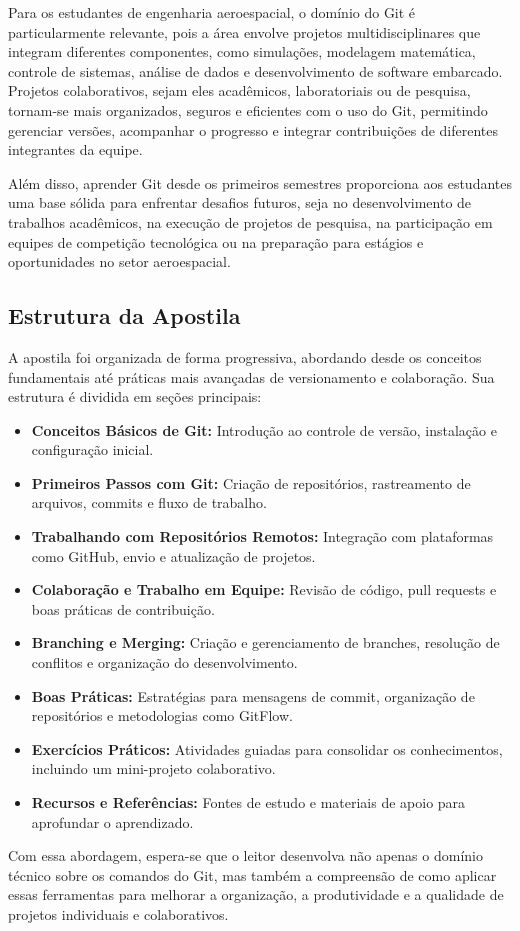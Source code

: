 Para os estudantes de engenharia aeroespacial, o domínio do Git é particularmente relevante, pois a área envolve projetos multidisciplinares que integram diferentes componentes, como simulações, modelagem matemática, controle de sistemas, análise de dados e desenvolvimento de software embarcado. Projetos colaborativos, sejam eles acadêmicos, laboratoriais ou de pesquisa, tornam-se mais organizados, seguros e eficientes com o uso do Git, permitindo gerenciar versões, acompanhar o progresso e integrar contribuições de diferentes integrantes da equipe.

Além disso, aprender Git desde os primeiros semestres proporciona aos estudantes uma base sólida para enfrentar desafios futuros, seja no desenvolvimento de trabalhos acadêmicos, na execução de projetos de pesquisa, na participação em equipes de competição tecnológica ou na preparação para estágios e oportunidades no setor aeroespacial.

\subsection{Estrutura da Apostila}

A apostila foi organizada de forma progressiva, abordando desde os conceitos fundamentais até práticas mais avançadas de versionamento e colaboração. Sua estrutura é dividida em seções principais:

\begin{itemize}
    \item \textbf{Conceitos Básicos de Git:} Introdução ao controle de versão, instalação e configuração inicial.
    \item \textbf{Primeiros Passos com Git:} Criação de repositórios, rastreamento de arquivos, commits e fluxo de trabalho.
    \item \textbf{Trabalhando com Repositórios Remotos:} Integração com plataformas como GitHub, envio e atualização de projetos.
    \item \textbf{Colaboração e Trabalho em Equipe:} Revisão de código, pull requests e boas práticas de contribuição.
    \item \textbf{Branching e Merging:} Criação e gerenciamento de branches, resolução de conflitos e organização do desenvolvimento.
    \item \textbf{Boas Práticas:} Estratégias para mensagens de commit, organização de repositórios e metodologias como GitFlow.
    \item \textbf{Exercícios Práticos:} Atividades guiadas para consolidar os conhecimentos, incluindo um mini-projeto colaborativo.
    \item \textbf{Recursos e Referências:} Fontes de estudo e materiais de apoio para aprofundar o aprendizado.
\end{itemize}

Com essa abordagem, espera-se que o leitor desenvolva não apenas o domínio técnico sobre os comandos do Git, mas também a compreensão de como aplicar essas ferramentas para melhorar a organização, a produtividade e a qualidade de projetos individuais e colaborativos.